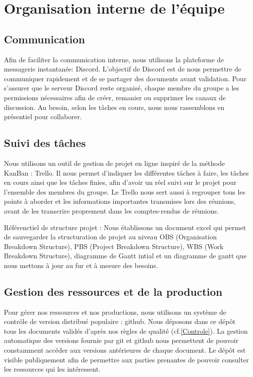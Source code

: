 \documentclass[11pt]{rapport_class}
\begin{document}
\section{Organisation interne de l'équipe}
\subsection{Communication}
\label{ discord interne }
\qquad Afin de faciliter la communication interne, nous utilisons la plateforme de messagerie instantanée: Discord. L'objectif de Discord est de nous permettre de communiquer rapidement et de se partager des documents avant validation. Pour s'assurer que le serveur Discord reste organisé, chaque membre du groupe a les permissions nécessaires afin de créer, remanier ou supprimer les canaux de discussion.
Au besoin, selon les tâches en cours, nous nous rassemblons en présentiel pour collaborer.

\subsection{Suivi des tâches}
\qquad Nous utilisons un outil de gestion de projet en ligne inspiré de la méthode KanBan : Trello. Il nous permet d’indiquer les différentes tâches à faire, les tâches en cours ainsi que les tâches finies, afin d’avoir un réel suivi sur le projet pour l’ensemble des membres du groupe. Le Trello nous sert aussi à regrouper tous les points à aborder et les informations importantes transmises lors des réunions, avant de les transcrire proprement dans les comptes-rendus de réunions.

Référenctiel de structure projet : Nous établissons un document excel qui permet de sauvegarder la structuration de projet au niveau OBS (Organisation Breakdown Structure), PBS (Project Breakdown Structure), WBS (Work Breakdown Structure), diagramme de Gantt intial et un diagramme de gantt que nous mettons à jour au fur et à mesure des besoins.

\subsection{Gestion des ressources et de la production}
\qquad Pour gérer nos ressources et nos productions, nous utilisons un système de contrôle de version distribué populaire : github. Nous déposons dans ce dépôt tous les documents validés d'après nos règles de qualité (cf.\ref{Controle}). La gestion automatique des versions fournie par git et github nous permettent de pouvoir constamment accéder aux versions antérieures de chaque document. Le dépôt est visible publiquement afin de permettre aux parties prenantes de pouvoir consulter les ressources qui les intéressent.
\end{document}
